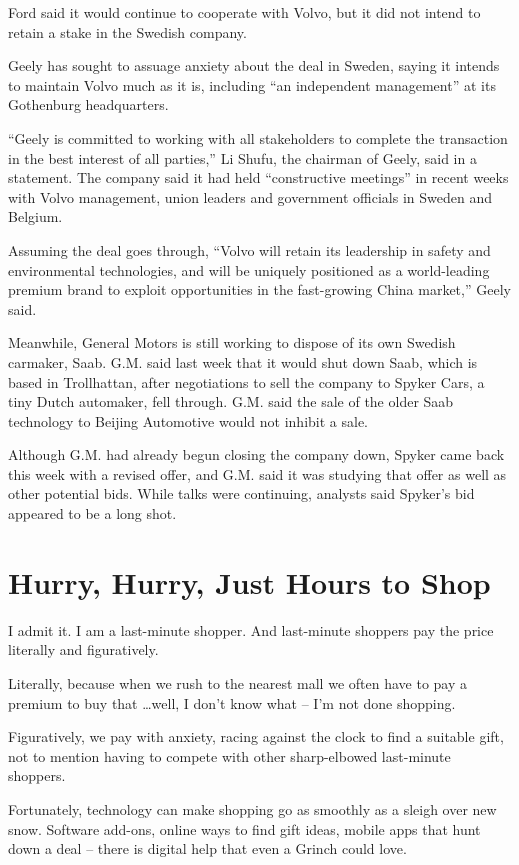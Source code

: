 ﻿\documentclass[12pt]{article}
\begin{document}
Ford said it would continue to cooperate with Volvo, but it did not intend to retain a stake in the
Swedish company.

Geely has sought to assuage anxiety about the deal in Sweden, saying it intends to maintain Volvo
much as it is, including ``an independent management'' at its Gothenburg headquarters.

``Geely is committed to working with all stakeholders to complete the transaction in the best
interest of all parties,'' Li Shufu, the chairman of Geely, said in a statement. The company said it
had held ``constructive meetings'' in recent weeks with Volvo management, union leaders and
government officials in Sweden and Belgium.

Assuming the deal goes through, ``Volvo will retain its leadership in safety and environmental
technologies, and will be uniquely positioned as a world-leading premium brand to exploit
opportunities in the fast-growing China market,'' Geely said.

Meanwhile, General Motors is still working to dispose of its own Swedish carmaker, Saab. G.M. said
last week that it would shut down Saab, which is based in Trollhattan, after negotiations to sell
the company to Spyker Cars, a tiny Dutch automaker, fell through. G.M. said the sale of the older
Saab technology to Beijing Automotive would not inhibit a sale.

Although G.M. had already begun closing the company down, Spyker came back this week with a revised
offer, and G.M. said it was studying that offer as well as other potential bids. While talks were
continuing, analysts said Spyker's bid appeared to be a long shot.

\section{Hurry, Hurry, Just Hours to Shop}

\lettrine{I}{} admit it. I am a last-minute shopper. And last-minute
shoppers pay the price literally and figuratively.

Literally, because when we rush to the nearest mall we often have to pay a premium to buy that
\ldots well, I don't know what -- I'm not done shopping.

Figuratively, we pay with anxiety, racing against the clock to find a suitable gift, not to mention
having to compete with other sharp-elbowed last-minute shoppers.

Fortunately, technology can make shopping go as smoothly as a sleigh over new snow. Software
add-ons, online ways to find gift ideas, mobile apps that hunt down a deal -- there is digital help
that even a Grinch could love.
\end{document}

